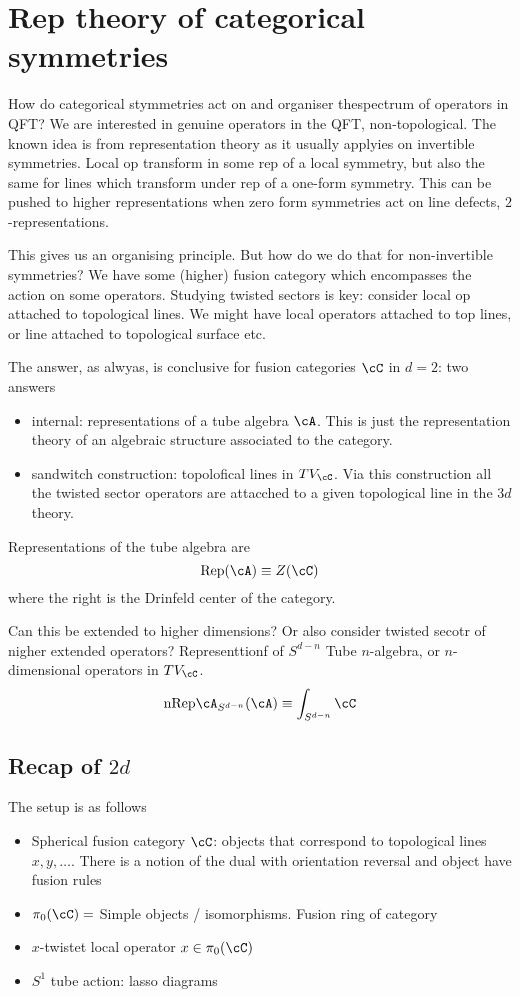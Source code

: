 \chapter{Rep theory of categorical symmetries}
How do categorical stymmetries act on and organiser thespectrum of operators in QFT? We are interested in genuine operators in the QFT, non-topological. The known idea is from representation theory as it usually applyies on invertible symmetries. Local op transform in some rep of a local symmetry, but also the same for lines which transform under rep of a one-form symmetry. This can be pushed to higher representations when zero form symmetries act on line defects, $2$-representations. 

This gives us an organising principle. But how do we do that for non-invertible symmetries? We have some (higher) fusion category which encompasses the action on some operators. Studying twisted sectors is key: consider local op attached to topological lines. We might have local operators attached to top lines, or line attached to topological surface etc. 

The answer, as alwyas, is conclusive for fusion categories $\cC$ in $d=2$: two answers
\begin{itemize}
	\item internal: representations of a tube algebra $\cA$. This is just the representation theory of an algebraic structure associated to the category.
	\item sandwitch construction: topolofical lines in $TV_\cC$. Via this construction all the twisted sector operators are attacched to a given topological line in the $3d$ theory.
\end{itemize}
Representations of the tube algebra are 
\begin{equation}
	\mathrm{Rep}(\cA)\equiv Z(\cC)
\end{equation}
where the right is the Drinfeld center of the category. 

Can this be extended to higher dimensions? Or also consider twisted secotr of nigher extended operators? Representtionf of $S^{d-n}$ Tube $n$-algebra, or $n$-dimensional operators in $TV_\cC$.
\begin{equation}
	\mathrm{nRep}\cA_{S^{d-n}}(\cA)\equiv \int_{S^{d-n}}\cC
\end{equation}

\section{Recap of $2d$}
The setup is as follows 
\begin{itemize}
	\item Spherical fusion category $\cC$: objects that correspond to topological lines $x,y,\ldots$. There is a notion of the dual with orientation reversal and object have fusion rules 
	\item $\pi_0(\cC)=$ Simple objects / isomorphisms. Fusion ring of category
	\item $x$-twistet local operator $x\in \pi_0(\cC)$
	\item $S^1$ tube action: lasso diagrams
\end{itemize}

